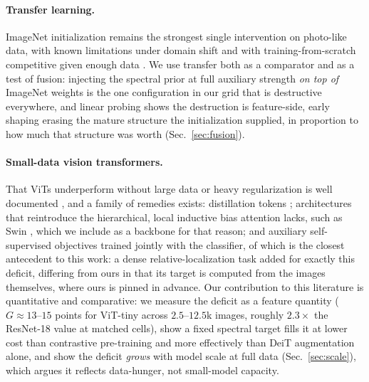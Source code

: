 \paragraph{Transfer learning.} ImageNet initialization remains the strongest
single intervention on photo-like data, with known limitations under domain
shift and with training-from-scratch competitive given enough data
\citep{he2019rethinking}. We use transfer both as a comparator and as a test of
fusion: injecting the spectral prior at full auxiliary strength \emph{on top
of} ImageNet weights is the
one configuration in our grid that is destructive everywhere, and linear
probing shows the destruction is feature-side, early shaping erasing the
mature structure the initialization supplied, in proportion to how much that
structure was worth (Sec.~\ref{sec:fusion}).

\paragraph{Small-data vision transformers.} That ViTs underperform without
large data or heavy regularization is well documented
\citep{dosovitskiy2021vit,touvron2021deit}, and a family of remedies exists:
distillation tokens \citep{touvron2021deit}; architectures that reintroduce the
hierarchical, local inductive bias attention lacks, such as Swin
\citep{liu2021swin}, which we include as a backbone for that reason; and
auxiliary self-supervised objectives trained jointly with the classifier, of
which \citet{liu2021efficientvit} is the closest antecedent to this work: a
dense relative-localization task added for exactly this deficit, differing from
ours in that its target is computed from the images themselves, where ours is
pinned in advance. Our contribution to this literature is quantitative and
comparative: we measure the deficit as a feature quantity ($G \approx 13$--$15$
points for ViT-tiny across $2.5$--$12.5$k images, roughly $2.3\times$ the
ResNet-18 value at matched cells), show a fixed spectral target fills it at lower cost
than contrastive pre-training and more effectively than DeiT augmentation
alone, and show the deficit \emph{grows} with model scale at full data
(Sec.~\ref{sec:scale}), which argues it reflects data-hunger, not
small-model capacity.

